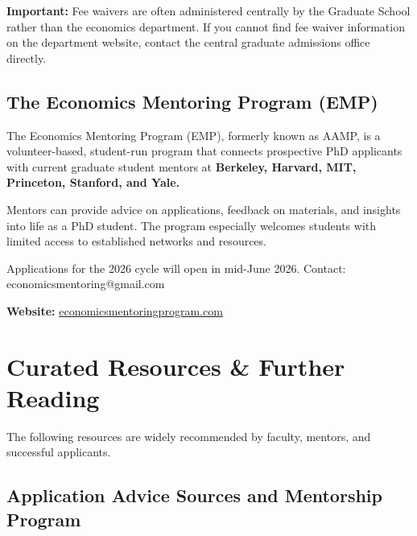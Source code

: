 \documentclass[11pt, letterpaper]{article}
\begin{document}
\textbf{Important:} Fee waivers are often administered centrally by the Graduate School rather than the economics department. If you cannot find fee waiver information on the department website, contact the central graduate admissions office directly.

\subsection{The Economics Mentoring Program (EMP)}

\begin{tipbox}
The Economics Mentoring Program (EMP), formerly known as AAMP, is a volunteer-based, student-run program that connects prospective PhD applicants with current graduate student mentors at \textbf{Berkeley, Harvard, MIT, Princeton, Stanford, and Yale.}

Mentors can provide advice on applications, feedback on materials, and insights into life as a PhD student. The program especially welcomes students with limited access to established networks and resources.

Applications for the 2026 cycle will open in mid-June 2026. Contact: economicsmentoring@gmail.com

\textbf{Website:} \href{https://www.economicsmentoringprogram.com/}{economicsmentoringprogram.com}
\end{tipbox}

\newpage

\section{Curated Resources \& Further Reading}

The following resources are widely recommended by faculty, mentors, and successful applicants.

\subsection{Application Advice Sources and Mentorship Program}
\end{document}

